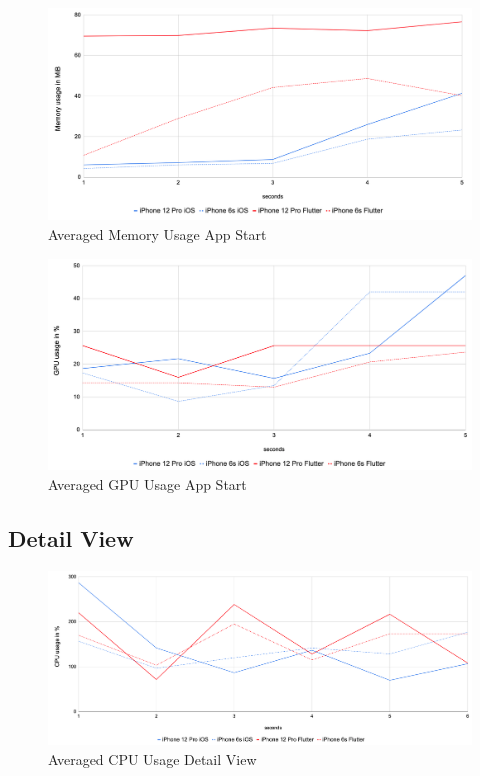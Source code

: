 \begin{figure}
    \centering
    \includegraphics[width=\linewidth]{images/performance_results/app_start/avg_memory_usage_app_start.png}
    \caption{Averaged Memory Usage App Start}
    \label{fig:avg_memory_usage_app_start}
\end{figure}

\begin{figure}
    \centering
    \includegraphics[width=\linewidth]{images/performance_results/app_start/avg_gpu_usage_app_start.png}
    \caption{Averaged GPU Usage App Start}
    \label{fig:avg_gpu_usage_app_start}
\end{figure}


\subsection{Detail View}
\begin{figure}
    \centering
    \includegraphics[width=\linewidth]{images/performance_results/detail_view/avg_cpu_usage_detail_view.png}
    \caption{Averaged CPU Usage Detail View}
    \label{fig:avg_cpu_usage_detail_view}
\end{figure}

